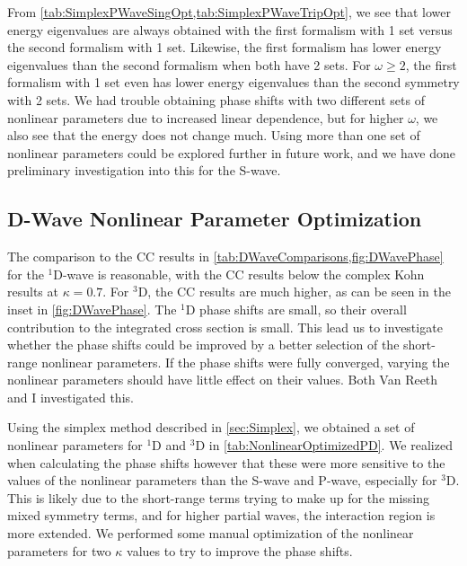 \documentclass[Dissertation.tex]{subfiles}
\begin{document}
From \cref{tab:SimplexPWaveSingOpt,tab:SimplexPWaveTripOpt}, we see that 
lower energy eigenvalues are always obtained with the first formalism with 1 
set versus the second formalism with 1 set. Likewise, the first formalism has 
lower energy eigenvalues than the second formalism when both have 2 sets. For 
$\omega \geq 2$, the first formalism with 1 set even has lower energy 
eigenvalues than the second symmetry with 2 sets. We had trouble obtaining 
phase shifts with two different sets of nonlinear parameters due to increased 
linear dependence, but for higher $\omega$, we also see that the energy does 
not change much. Using more than one set of nonlinear parameters could be 
explored further in future work, and we have done preliminary investigation 
into this for the S-wave.


\subsection{D-Wave Nonlinear Parameter Optimization}
\label{sec:DWaveNonlinear}

The comparison to the CC results \cite{Walters2004,Blackwood2002}
in \cref{tab:DWaveComparisons,fig:DWavePhase} for the $^1$D-wave is
reasonable, with the CC results below the complex Kohn results at $\kappa = 0.7$.
For $^3$D, the CC results are much higher, as can be seen in the inset
in \cref{fig:DWavePhase}. The $^1$D phase shifts are small, so their overall
contribution to the integrated cross section is small. 
This lead us to investigate whether the phase shifts could be improved by a
better selection of the short-range nonlinear parameters. If the phase shifts
were fully converged, varying the nonlinear parameters should have little
effect on their values. Both Van Reeth \cite{VanReethPrivate} and I
investigated this.

Using the simplex method described in \cref{sec:Simplex}, we obtained a set of
nonlinear parameters for $^1$D and $^3$D in \cref{tab:NonlinearOptimizedPD}.
We realized when calculating the phase shifts however that these were more
sensitive to the values of the nonlinear parameters than the S-wave and P-wave,
especially for $^3$D. This is likely due to the short-range terms trying to
make up for the missing mixed symmetry terms, and for higher partial waves, the
interaction region is more extended. We performed some manual
optimization of the nonlinear parameters for two $\kappa$ values to try to
improve the phase shifts.
\end{document}
